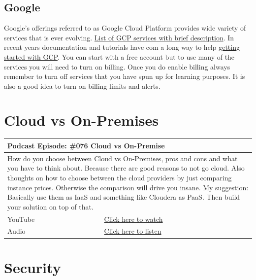 \documentclass[12pt, numbers=noenddot]{scrreprt} %
\begin{document}
\subsection{Google}
Google's offerings referred to as Google Cloud Platform provides wide variety of services that is ever evolving. \href{https://github.com/gregsramblings/google-cloud-4-words}{List of GCP services with brief description}.  In recent years documentation and tutorials have com a long way to help \href{https://cloud.google.com/gcp/getting-started/}{getting started with GCP}.  You can start with a free account but to use many of the services you will need to turn on billing.  Once you do enable billing always remember to turn off services that you have spun up for learning purposes.  It is also a good idea to turn on billing limits and alerts. 

\section{Cloud vs On-Premises}

\begin{table}[h]
\begin{tabular}{ll}
\hline
\multicolumn{2}{l}{\textbf{Podcast Episode:} \#076 Cloud vs On-Premise} \\ \hline
\multicolumn{2}{p{15cm}}{How do you choose between Cloud vs On-Premises, pros and cons and what you have to think about. Because there are good reasons to not go cloud.
Also thoughts on how to choose between the cloud providers by just comparing instance prices. Otherwise the comparison will drive you insane.
My suggestion: Basically use them as IaaS and something like Cloudera as PaaS. Then build your solution on top of that.  }         \\ \hline
\multicolumn{1}{l|}{YouTube}   & \href{https://youtu.be/BAzj0yGcrnE}{Click here to watch}   \\
\multicolumn{1}{l|}{Audio}     & \href{https://anchor.fm/andreaskayy/episodes/076-Cloud-vs-On-Premise-How-To-Decide-e45ivk}{Click here to listen}   \\ \hline
\end{tabular}
\end{table}

\section{Security}
\end{document}
